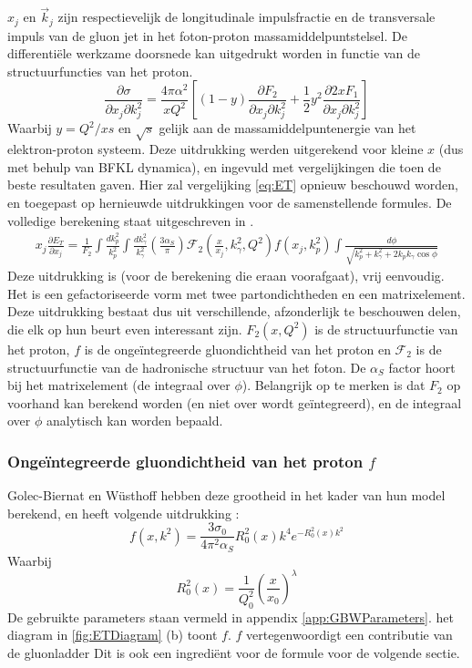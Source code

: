 \documentclass[a4paper,11pt]{article}
\numberwithin{equation}{section} %
\begin{document}
$x_j$  en $\vec{k}_j$ zijn respectievelijk de longitudinale impulsfractie en de transversale impuls van de gluon jet in het foton-proton massamiddelpuntstelsel.
De differentiële werkzame doorsnede kan uitgedrukt worden in functie van de structuurfuncties van het proton.
\begin{equation}
\frac{\partial \sigma}{\partial x_j \partial k_j^2} = \frac{4 \pi \alpha^2}{xQ^2} \left[ (1-y) \frac{\partial F_2}{\partial x_j \partial k_j^2} + \frac{1}{2} y^2 \frac{\partial 2xF_1}{\partial x_j \partial k_j^2} \right]
\end{equation}
Waarbij $y=Q^2/xs$ en $\sqrt{s}$ gelijk aan de massamiddelpuntenergie van het elektron-proton systeem.
Deze uitdrukking werden uitgerekend voor kleine $x$ (dus met behulp van BFKL dynamica), en ingevuld met vergelijkingen die toen de beste resultaten gaven.
Hier zal vergelijking  \eqref{eq:ET} opnieuw beschouwd worden, en toegepast op hernieuwde uitdrukkingen voor de samenstellende formules.
De volledige berekening staat uitgeschreven in \cite{ET}.
\begin{align} \label{eq:ET}
x_j \frac{\partial E_T}{\partial x_j} = \frac{1}{F_2} \int \frac{dk_p^2}{k_p^2} \int \frac{dk_\gamma^2}{k_\gamma^2} \left( \frac{3\alpha_S}{\pi} \right) \mathcal{F}_2 \left( \frac{x}{x_j}, k_\gamma^2, Q^2 \right) f(x_j,k_p^2) \int \frac{d\phi}{\sqrt{k_p^2+k_\gamma^2 + 2k_p k_\gamma \cos{\phi}}}
\end{align}
Deze uitdrukking is (voor de berekening die eraan voorafgaat), vrij eenvoudig.
Het is een gefactoriseerde vorm met twee partondichtheden en een matrixelement.
Deze uitdrukking bestaat dus uit verschillende, afzonderlijk te beschouwen delen, die elk op hun beurt even interessant zijn.
$F_2 (x, Q^2)$ is de structuurfunctie van het proton, $f$ is de ongeïntegreerde gluondichtheid van het proton en $\mathcal{F}_2$ is de structuurfunctie van de hadronische structuur van het foton.
De $\alpha_S$ factor hoort bij het matrixelement (de integraal over $\phi$).
Belangrijk op te merken is dat $F_2$ op voorhand kan berekend worden (en niet over wordt geïntegreerd), en de integraal over $\phi$ analytisch kan worden bepaald.
 
    \subsubsection{Ongeïntegreerde gluondichtheid van het proton $f$}
Golec-Biernat en Wüsthoff hebben deze grootheid in het kader van hun model berekend, en heeft volgende uitdrukking \cite[vgl. 9.255]{Barone}:
\begin{equation} \label{eq:UGD}
f(x,k^2) = \frac{3 \sigma_0}{4\pi^2 \alpha_S} R_0^2 (x) k^4 e^{-R_0^2(x) k^2}
\end{equation}
Waarbij
\begin{equation}
R_0^2(x) = \frac{1}{Q_0^2} \left( \frac{x}{x_0} \right)^\lambda
\end{equation}
De gebruikte parameters staan vermeld in appendix \ref{app:GBWParameters}.
het diagram in \ref{fig:ETDiagram} (b) toont $f$.
$f$ vertegenwoordigt een contributie van de gluonladder
Dit is ook een ingrediënt voor de formule voor de volgende sectie.
\end{document}
